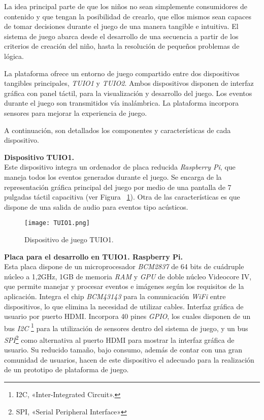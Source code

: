 La idea principal parte de que los niños no sean simplemente consumidores de contenido y que tengan la posibilidad de crearlo, que ellos mismos sean capaces de tomar decisiones durante el juego de una manera tangible e intuitiva. El sistema de juego abarca desde el desarrollo de una secuencia a partir de los criterios de creación del niño, hasta la resolución de pequeños problemas de lógica.

La plataforma ofrece un entorno de juego compartido entre dos dispositivos tangibles principales, \emph{TUIO1} y \emph{TUIO2}. Ambos dispositivos disponen de interfaz gráfica con panel táctil, para la visualización y desarrollo del juego. Los eventos durante el juego son transmitidos vía inalámbrica. La plataforma incorpora sensores para mejorar la experiencia de juego. 
 
A continuación, son detallados los componentes y características de cada dispositivo.


\textbf{Dispositivo TUIO1.}\\
Este dispositivo integra un ordenador de placa reducida \emph{Raspberry Pi}, que maneja todos los eventos generados durante el juego. Se encarga de la representación gráfica principal del juego por medio de una pantalla de 7 pulgadas táctil capacitiva (ver Figura ~\ref{fig:TUIO1}). Otra de las características es que dispone de una salida de audio para eventos tipo acústicos.

\begin{figure}[!h]
\begin{center}
\texttt{[image: TUIO1.png]}
\caption{Dispositivo de juego TUIO1.}
\label{fig:TUIO1}
\end{center}
\end{figure}


\textbf{Placa para el desarrollo en TUIO1. Raspberry Pi.}\\
Esta placa dispone de un microprocesador \emph{BCM2837} de 64 bits de cuádruple núcleo a 1,2GHz, 1GB de memoria \emph{RAM} y \emph{GPU} de doble núcleo Videocore IV, que permite manejar y procesar eventos e imágenes según los requisitos de la aplicación.
Integra el chip \emph{BCM43143} para la comunicación \emph{WiFi} entre dispositivos, lo que elimina la necesidad de utilizar cables. Interfaz gráfica de usuario por puerto HDMI.
Incorpora 40 pines \emph{GPIO}, los cuales disponen de un bus \emph{I2C} \footnote{I2C, «Inter-Integrated Circuit».} para la utilización de sensores dentro del sistema de juego, y un bus \emph{SPI}\footnote{SPI, «Serial Peripheral Interface» } como alternativa al puerto HDMI para mostrar la interfaz gráfica de usuario.
Su reducido tamaño, bajo consumo, además de contar con una gran comunidad de usuarios, hacen de este dispositivo el adecuado para la realización de un prototipo de plataforma de juego.\\


